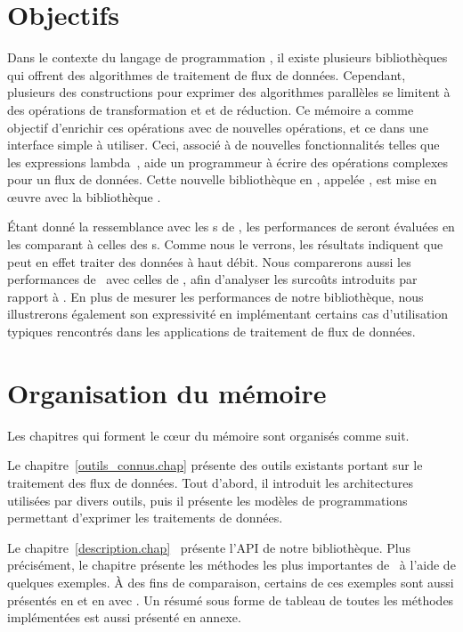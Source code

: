 \begin{introduction}
\section*{Objectifs}


Dans le contexte du langage de programmation , il existe plusieurs biblioth\`eques qui offrent des algorithmes de traitement de flux de donn\'ees. Cependant, plusieurs des constructions pour exprimer des algorithmes parall\`eles se limitent \`a des op\'erations de transformation et et de r\'eduction. Ce m\'emoire a comme objectif d'enrichir ces op\'erations avec de nouvelles op\'erations, et ce dans une interface simple \`a utiliser. Ceci, associ\'e \`a de nouvelles fonctionnalit\'es telles que les expressions lambda~\citep{josuttis2012c++}, aide un programmeur \`a \'ecrire des op\'erations complexes pour un flux de donn\'ees. Cette nouvelle bibliothèque en , appel\'ee ,  est mise en \oe{}uvre avec la biblioth\`eque .


\'Etant donn\'e la ressemblance avec les s de ,
les performances de  seront \'evalu\'ees en les comparant \`a celles des s. Comme nous le verrons, les r\'esultats indiquent que  peut en effet traiter des donn\'ees \`a haut d\'ebit.
%
Nous comparerons aussi les performances de \ppff\ avec celles de
, afin d'analyser les surco\^uts introduits par rapport à .
%
En plus de mesurer les performances de notre bibliothèque, nous illustrerons \'egalement son expressivit\'e en impl\'ementant certains cas d'utilisation typiques rencontr\'es dans les applications de traitement de flux de donn\'ees.


\section*{Organisation du m\'emoire}

Les chapitres qui forment le c\oe{}ur du m\'emoire sont organis\'es
comme suit.


Le chapitre~\ref{outils_connus.chap}  pr\'esente des outils existants portant sur le traitement des flux de donn\'ees.  Tout d'abord, il introduit les architectures utilis\'ees par divers outils, puis il pr\'esente les mod\`eles de programmations permettant d'exprimer les traitements de donn\'ees.

Le chapitre~\ref{description.chap}~
pr\'esente l'API de notre bibliothèque.
%
Plus précisément, le chapitre présente les m\'ethodes les plus
importantes de \ppff\ à l'aide de quelques exemples.  À des fins de
comparaison, certains de ces exemples sont aussi présentés en
 et en  avec .
%
Un r\'esum\'e sous forme de tableau de toutes les m\'ethodes
implément\'ees est aussi pr\'esent\'e en annexe.


\end{introduction}
